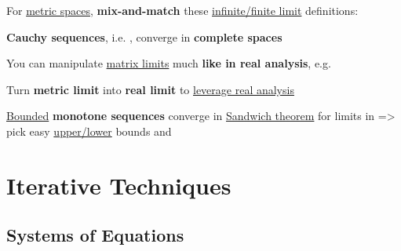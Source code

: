 \hSep %

For \underline{metric spaces}, \textbf{mix-and-match} these \underline{infinite/finite limit}
definitions:
\begin{itemize}
      \vItem
      \vItem
      \vItem
            \textbf{Cauchy sequences},
            i.e. ,
            converge in \textbf{complete spaces}
\end{itemize}
You can manipulate \underline{matrix limits} much \textbf{like in real analysis},
e.g. 

\hSep %

Turn \textbf{metric limit}  into \textbf{real limit}
 to \underline{leverage real analysis}
\begin{itemize}
      \vItem
            \underline{Bounded} \textbf{monotone sequences} converge in 
      \vItem
            \underline{Sandwich theorem} for limits in  =>
            pick easy \underline{upper/lower} bounds
      \vItem
             and
\end{itemize}

\section*{Iterative Techniques}

\subsection*{Systems of Equations}


